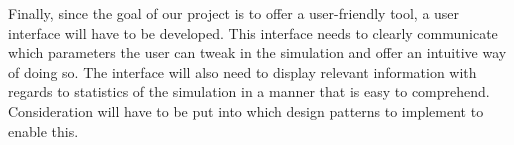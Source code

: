 Finally, since the goal of our project is to offer a user-friendly tool, a user interface will have to be developed. This interface needs to clearly communicate which parameters the user can tweak in the simulation and offer an intuitive way of doing so. The interface will also need to display relevant information with regards to statistics of the simulation in a manner that is easy to comprehend. Consideration will have to be put into which design patterns to implement to enable this. 